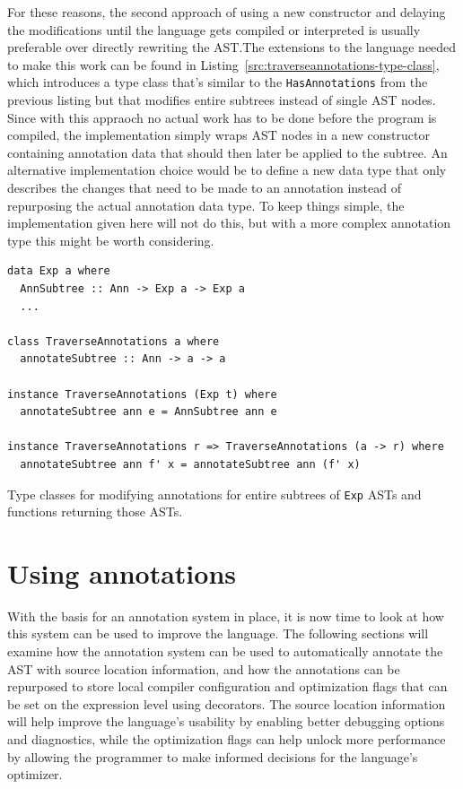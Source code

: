 \documentclass[fontsize=11pt,a4paper,parskip=half,numbers=noenddot]{scrartcl}
\newcommand{\hask}[1]{\texttt{#1}}
\begin{document}
For these reasons, the second approach of using a new constructor and delaying
the modifications until the language gets compiled or interpreted is usually
preferable over directly rewriting the AST.\@ The extensions to the language
needed to make this work can be found in
Listing~\ref{src:traverseannotations-type-class}, which introduces a type class
that's similar to the \hask{HasAnnotations} from the previous listing but that
modifies entire subtrees instead of single AST nodes. Since with this appraoch
no actual work has to be done before the program is compiled, the implementation
simply wraps AST nodes in a new constructor containing annotation data that
should then later be applied to the subtree. An alternative implementation
choice would be to define a new data type that only describes the changes that
need to be made to an annotation instead of repurposing the actual annotation
data type. To keep things simple, the implementation given here will not do
this, but with a more complex annotation type this might be worth considering.

\begin{listing}[!ht]
\begin{verbatim}
data Exp a where
  AnnSubtree :: Ann -> Exp a -> Exp a
  ...

class TraverseAnnotations a where
  annotateSubtree :: Ann -> a -> a

instance TraverseAnnotations (Exp t) where
  annotateSubtree ann e = AnnSubtree ann e

instance TraverseAnnotations r => TraverseAnnotations (a -> r) where
  annotateSubtree ann f' x = annotateSubtree ann (f' x)
\end{verbatim}
\caption{Type classes for modifying annotations for entire subtrees of \hask{Exp} ASTs and functions returning those ASTs.}\label{src:traverseannotations-type-class}
\end{listing}

\section{Using annotations}

With the basis for an annotation system in place, it is now time to look at how
this system can be used to improve the language. The following sections will
examine how the annotation system can be used to automatically annotate the AST
with source location information, and how the annotations can be repurposed to
store local compiler configuration and optimization flags that can be set on the
expression level using decorators. The source location information will help
improve the language's usability by enabling better debugging options and
diagnostics, while the optimization flags can help unlock more performance by
allowing the programmer to make informed decisions for the language's optimizer.
\end{document}
